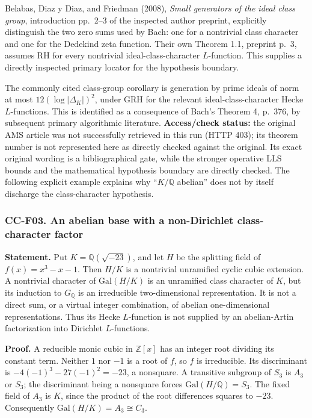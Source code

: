Belabas, Diaz y Diaz, and Friedman (2008), \emph{Small generators of the
ideal class group}, introduction pp.~2--3 of the inspected author
preprint, explicitly distinguish the two zero sums used by Bach: one for
a nontrivial class character and one for the Dedekind zeta function.
Their own Theorem 1.1, preprint p.~3, assumes RH for every nontrivial
ideal-class-character \(L\)-function. This supplies a directly inspected
primary locator for the hypothesis boundary.

The commonly cited class-group corollary is generation by prime ideals
of norm at most \(12(\log|\Delta_K|)^2\), under GRH for the relevant
ideal-class-character Hecke \(L\)-functions. This is identified as a
consequence of Bach's Theorem 4, p.~376, by subsequent primary
algorithmic literature. \textbf{Access/check status:} the original AMS
article was not successfully retrieved in this run (HTTP 403); its
theorem number is not represented here as directly checked against the
original. Its exact original wording is a bibliographical gate, while
the stronger operative LLS bounds and the mathematical hypothesis
boundary are directly checked. The following explicit example explains
why ``\(K/\mathbb Q\) abelian'' does not by itself discharge the
class-character hypothesis.

\subsubsection{CC-F03. An abelian base with a non-Dirichlet
class-character
factor}\label{cc-f03.-an-abelian-base-with-a-non-dirichlet-class-character-factor}

\textbf{Statement.} Put \(K=\mathbb Q(\sqrt{-23})\), and let \(H\) be
the splitting field of \(f(x)=x^3-x-1\). Then \(H/K\) is a nontrivial
unramified cyclic cubic extension. A nontrivial character of
\(\mathrm{Gal}(H/K)\) is an unramified class character of \(K\), but its
induction to \(G_\mathbb Q\) is an irreducible two-dimensional
representation. It is not a direct sum, or a virtual integer
combination, of abelian one-dimensional representations. Thus its Hecke
\(L\)-function is not supplied by an abelian-Artin factorization into
Dirichlet \(L\)-functions.

\textbf{Proof.} A reducible monic cubic in \(\mathbb Z[x]\) has an
integer root dividing its constant term. Neither \(1\) nor \(-1\) is a
root of \(f\), so \(f\) is irreducible. Its discriminant is
\(-4(-1)^3-27(-1)^2=-23\), a nonsquare. A transitive subgroup of \(S_3\)
is \(A_3\) or \(S_3\); the discriminant being a nonsquare forces
\(\mathrm{Gal}(H/\mathbb Q)=S_3\). The fixed field of \(A_3\) is \(K\),
since the product of the root differences squares to \(-23\).
Consequently \(\mathrm{Gal}(H/K)=A_3\cong C_3\).

